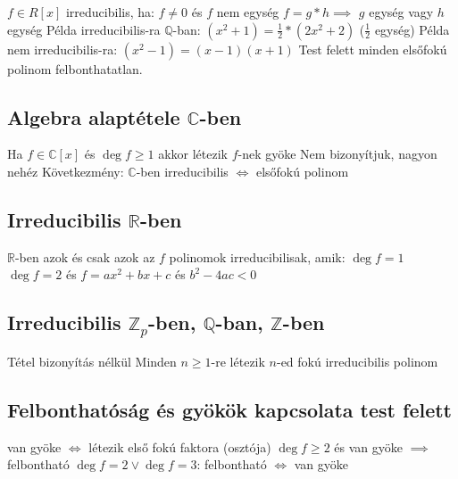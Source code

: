 \documentclass[12pt,a4paper]{article}
\begin{document}
\begin{outline}
	\1 $f \in R[x]$ irreducibilis, ha:
		\2 $f \ne 0$ és $f$ nem egység
		\2 $f=g*h \implies$ $g$ egység vagy $h$ egység
	\1 Példa irreducibilis-ra $\mathbb{Q}$-ban: $(x^2+1)=\frac{1}{2}*(2x^2+2)$ \;\; ($\frac{1}{2}$ egység)
	\1 Példa nem irreducibilis-ra: $(x^2-1)=(x-1)(x+1)$
	\1 Test felett minden elsőfokú polinom felbonthatatlan.
\end{outline}

\subsection{Algebra alaptétele $\mathbb{C}$-ben}

\begin{outline}
	\1 Ha $f \in \mathbb{C}[x]$ és $\deg f \ge 1$ akkor létezik $f$-nek gyöke
	\1 Nem bizonyítjuk, nagyon nehéz
	\1 Következmény: $\mathbb{C}$-ben irreducibilis $\Leftrightarrow$ elsőfokú polinom
\end{outline}

\subsection{Irreducibilis $\mathbb{R}$-ben}

\begin{outline}
	\1 $\mathbb{R}$-ben azok és csak azok az $f$ polinomok irreducibilisak, amik:
		\2 $\deg f = 1$
		\2 $\deg f = 2$ és $f=ax^2+bx+c$ és $b^2-4ac < 0$
\end{outline}

\subsection{Irreducibilis $\mathbb{Z}_p$-ben, $\mathbb{Q}$-ban, $\mathbb{Z}$-ben}

\begin{outline}
	\1 Tétel bizonyítás nélkül
	\1 Minden $n \ge 1$-re létezik $n$-ed fokú irreducibilis polinom
\end{outline}

\subsection{Felbonthatóság és gyökök kapcsolata test felett}

\begin{outline}
	\1 van gyöke $\Leftrightarrow$ létezik első fokú faktora (osztója)
	\1 $\deg f \ge 2$ és van gyöke $\implies$ felbontható
	\1 $\deg f = 2 \lor \deg f = 3$: felbontható $\Leftrightarrow$ van gyöke
\end{outline}
\end{document}
